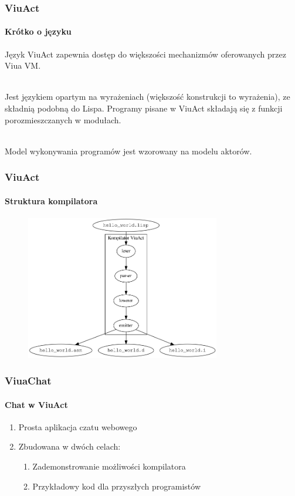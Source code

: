 \documentclass[aspectratio=169]{beamer}
\begin{document}
\begin{frame}
    \frametitle{ViuAct}
    \framesubtitle{Krótko o języku}

    Język ViuAct zapewnia dostęp do większości mechanizmów oferowanych przez Viua VM.

    ~\\

    Jest językiem opartym na wyrażeniach (większość konstrukcji to wyrażenia), ze składnią podobną do Lispa.
    Programy pisane w ViuAct składają się z funkcji porozmieszczanych w modułach.

    ~\\

    Model wykonywania programów jest wzorowany na modelu aktorów.
\end{frame}

\begin{frame}
    \frametitle{ViuAct}
    \framesubtitle{Struktura kompilatora}

    \begin{figure}[!htp]
        \centering
        \includegraphics[width=8.5cm]{viuact-ogolny-schemat-kompilatora}
    \end{figure}
\end{frame}

\begin{frame}
    \frametitle{ViuaChat}
    \framesubtitle{Chat w ViuAct}

    \begin{enumerate}
        \item Prosta aplikacja czatu webowego
        \item Zbudowana w dwóch celach:
        \begin{enumerate}
        	\item Zademonstrowanie możliwości kompilatora
        	\item Przykładowy kod dla przyszłych programistów
        \end{enumerate}
    \end{enumerate}
\end{frame}
\end{document}

